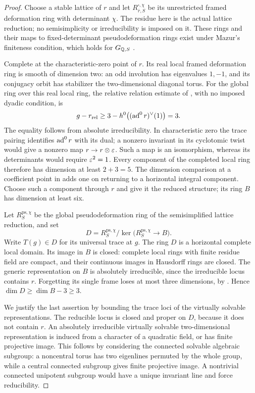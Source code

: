 \begin{proof}
Choose a stable lattice of $r$ and let $R^{\square,\chi}_{\bar r,S}$
be its unrestricted framed deformation ring with determinant $\chi$.
The residue here is the actual lattice reduction; no semisimplicity
or irreducibility is imposed on it.  These rings and their maps to
fixed-determinant pseudodeformation rings exist under Mazur's
finiteness condition, which holds for $G_{\mathbb Q,S}$
\cite[Proposition~3.1]{FM2}.

Complete at the characteristic-zero point of $r$.  Its real local
framed deformation ring is smooth of dimension two: an odd
involution has eigenvalues $1,-1$, and its conjugacy orbit has
stabilizer the two-dimensional diagonal torus.  For the global ring
over this real local ring, the relative relation estimate of
\cite[Proposition~3.6]{FM2}, with no imposed dyadic condition, is
\[
 g-r_{\mathrm{rel}}\ge
 3-h^0\bigl((\operatorname{ad}^0r)^\vee(1)\bigr)=3.
\]
The equality follows from absolute irreducibility.  In characteristic
zero the trace pairing identifies $\operatorname{ad}^0r$ with its dual; a nonzero
invariant in its cyclotomic twist would give a nonzero map
$r\to r\otimes\varepsilon$.  Such a map is an isomorphism, whereas its
determinants would require $\varepsilon^2=1$.  Every component of the
completed local ring therefore has dimension at least $2+3=5$.
The dimension comparison at a coefficient point in
\cite[Lemma~3.4]{FM2} adds one on returning to a horizontal integral
component.  Choose such a component through $r$ and give it the
reduced structure; its ring $B$ has dimension at least six.

Let $R^{\mathrm{ps},\chi}_{S}$ be the global pseudodeformation ring
of the semisimplified lattice reduction, and set
\[
 D=R^{\mathrm{ps},\chi}_{S}/
       \ker\bigl(R^{\mathrm{ps},\chi}_{S}\longrightarrow B\bigr).
\]
Write $T(g)\in D$ for its universal trace at $g$.  The ring $D$
is a horizontal complete local domain.  Its image in $B$ is
closed: complete local rings with finite residue field are compact,
and their continuous images in Hausdorff rings are closed.  The
generic representation on $B$ is absolutely irreducible, since the
irreducible locus contains $r$.  Forgetting its single frame loses
at most three dimensions, by \cite[Lemma~3.2]{FM2}.  Hence
$\dim D\ge\dim B-3\ge3$.

We justify the last assertion by bounding the trace loci of the
virtually solvable representations.  The reducible locus is closed
and proper on $D$, because it does not contain $r$.  An absolutely
irreducible virtually solvable two-dimensional representation is
induced from a character of a quadratic field, or has finite
projective image.  This follows by considering the connected
solvable algebraic subgroup: a noncentral torus has two eigenlines
permuted by the whole group, while a central connected subgroup gives
finite projective image.  A nontrivial connected unipotent subgroup
would have a unique invariant line and force reducibility.


\end{proof}
